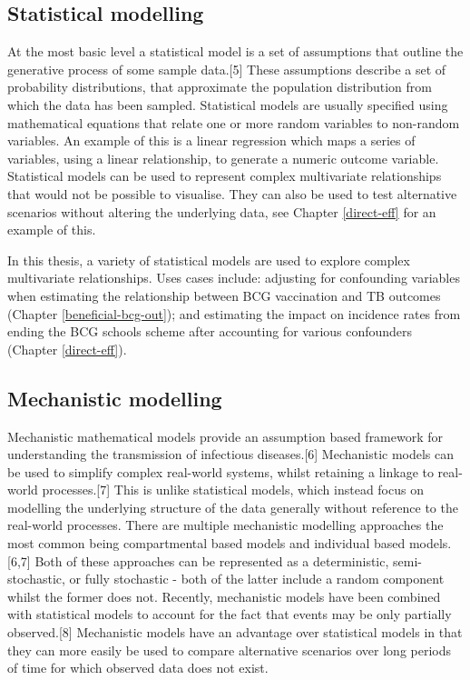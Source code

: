 \documentclass[11pt,twoside]{bristolthesis}
\begin{document}
  \hypertarget{statistical-modelling}{%
  \subsection{Statistical modelling}\label{statistical-modelling}}
  
  At the most basic level a statistical model is a set of assumptions that outline the generative process of some sample data.{[}5{]} These assumptions describe a set of probability distributions, that approximate the population distribution from which the data has been sampled. Statistical models are usually specified using mathematical equations that relate one or more random variables to non-random variables. An example of this is a linear regression which maps a series of variables, using a linear relationship, to generate a numeric outcome variable. Statistical models can be used to represent complex multivariate relationships that would not be possible to visualise. They can also be used to test alternative scenarios without altering the underlying data, see Chapter \ref{direct-eff} for an example of this.
  
  In this thesis, a variety of statistical models are used to explore complex multivariate relationships. Uses cases include: adjusting for confounding variables when estimating the relationship between BCG vaccination and TB outcomes (Chapter \ref{beneficial-bcg-out}); and estimating the impact on incidence rates from ending the BCG schools scheme after accounting for various confounders (Chapter \ref{direct-eff}).
  
  \hypertarget{mechanistic-modelling}{%
  \subsection{Mechanistic modelling}\label{mechanistic-modelling}}
  
  Mechanistic mathematical models provide an assumption based framework for understanding the transmission of infectious diseases.{[}6{]} Mechanistic models can be used to simplify complex real-world systems, whilst retaining a linkage to real-world processes.{[}7{]} This is unlike statistical models, which instead focus on modelling the underlying structure of the data generally without reference to the real-world processes. There are multiple mechanistic modelling approaches the most common being compartmental based models and individual based models.{[}6,7{]} Both of these approaches can be represented as a deterministic, semi-stochastic, or fully stochastic - both of the latter include a random component whilst the former does not. Recently, mechanistic models have been combined with statistical models to account for the fact that events may be only partially observed.{[}8{]} Mechanistic models have an advantage over statistical models in that they can more easily be used to compare alternative scenarios over long periods of time for which observed data does not exist.
  
\end{document}
